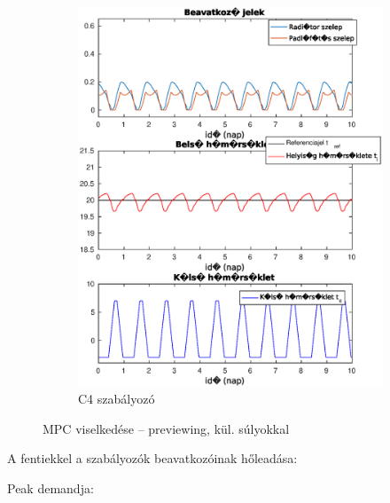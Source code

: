 \begin{figure}[H]
\begin{subfigure}[t]{0.32\textwidth}
		\includegraphics[trim=0 0 0 0, clip,width=\textwidth]{figures/onlab/constRefPrev/C4constref}
		\caption{C4 szabályozó}
		\label{fig:mpc-wy-5}
	\end{subfigure}
	\caption{MPC viselkedése -- previewing, kül. súlyokkal}
	\label{fig:mpc-previeWeight}
\end{figure}

A fentiekkel a szabályozók beavatkozóinak hőleadása:

Peak demandja:

